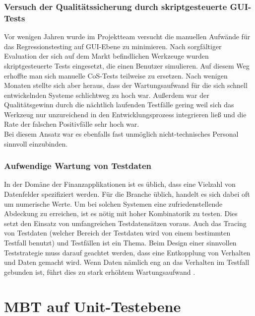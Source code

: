 \subsubsection{Versuch der Qualitätssicherung durch skriptgesteuerte GUI-Tests}
\label{sec:versuch_script}
Vor wenigen Jahren wurde im Projektteam versucht die manuellen Aufwände für das Regressionstesting auf GUI-Ebene zu minimieren. Nach sorgfältiger Evaluation der sich auf dem Markt befindlichen Werkzeuge wurden skriptgesteuerte Tests eingesetzt, die einen Benutzer simulieren. Auf diesem Weg erhoffte man sich manuelle CoS-Tests teilweise zu ersetzen. Nach wenigen Monaten stellte sich aber heraus, dass der Wartungsaufwand für die sich schnell entwickelnden Systeme schlichtweg zu hoch war. Außerdem war der Qualitätsgewinn durch die nächtlich laufenden Testfälle gering weil sich das Werkzeug nur unzureichend in den Entwicklungsprozess integrieren ließ und die Rate der falschen Positivfälle sehr hoch war.\\
Bei diesem Ansatz war es ebenfalls fast unmöglich nicht-technisches Personal sinnvoll einzubinden.

\subsubsection{Aufwendige Wartung von Testdaten}
In der Domäne der Finanzapplikationen ist es üblich, dass eine Vielzahl von Datenfelder spezifiziert werden. Für die Branche üblich, handelt es sich dabei oft um numerische Werte. Um bei solchen Systemen eine zufriedenstellende Abdeckung zu erreichen, ist es nötig mit hoher Kombinatorik zu testen. Dies setzt den Einsatz von umfangreichen Testdatensätzen voraus. Auch das Tracing  von Testdaten (welcher Bereich der Testdaten wird von einem bestimmten Testfall benutzt) und Testfällen ist ein Thema. Beim Design einer sinnvollen Teststrategie muss darauf geachtet werden, dass eine Entkopplung von Verhalten und Daten gemacht wird. Wenn Daten nämlich eng an das Verhalten im Testfall gebunden ist, führt dies zu stark erhöhtem Wartungsaufwand \cite{baker_model-driven_2005}. 


\section{MBT auf Unit-Testebene}
\label{sec:mbt_unit}
